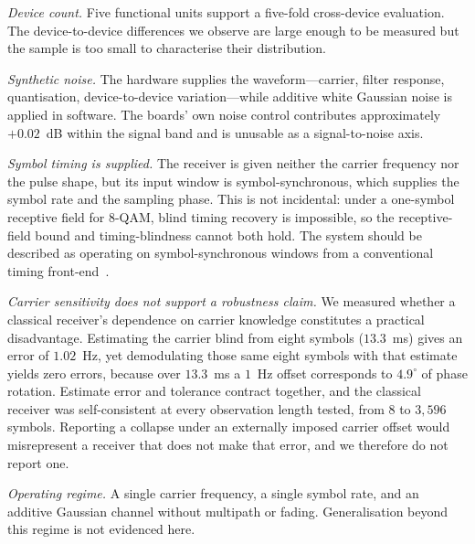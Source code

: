 \documentclass[journal]{IEEEtran}   %
\begin{document}
\emph{Device count.} Five functional units support a five-fold cross-device
evaluation. The device-to-device differences we observe are large enough to be
measured but the sample is too small to characterise their distribution.

\emph{Synthetic noise.} The hardware supplies the waveform---carrier, filter
response, quantisation, device-to-device variation---while additive white
Gaussian noise is applied in software. The boards' own noise control contributes
approximately $+0.02$~dB within the signal band and is unusable as a
signal-to-noise axis.

\emph{Symbol timing is supplied.} The receiver is given neither the carrier
frequency nor the pulse shape, but its input window is symbol-synchronous, which
supplies the symbol rate and the sampling phase. This is not incidental: under a
one-symbol receptive field for 8-QAM, blind timing recovery is impossible, so
the receptive-field bound and timing-blindness cannot both hold. The system
should be described as operating on symbol-synchronous windows from a
conventional timing front-end~\cite{gardner1986ted}.

\emph{Carrier sensitivity does not support a robustness claim.} We measured
whether a classical receiver's dependence on carrier knowledge constitutes a
practical disadvantage. Estimating the carrier blind from eight symbols
($13.3$~ms) gives an error of $1.02$~Hz, yet demodulating those same eight
symbols with that estimate yields zero errors, because over $13.3$~ms a $1$~Hz
offset corresponds to $4.9^{\circ}$ of phase rotation. Estimate error and
tolerance contract together, and the classical receiver was self-consistent at
every observation length tested, from 8 to $3{,}596$ symbols. Reporting a
collapse under an externally imposed carrier offset would misrepresent a
receiver that does not make that error, and we therefore do not report one.

\emph{Operating regime.} A single carrier frequency, a single symbol rate, and
an additive Gaussian channel without multipath or fading. Generalisation beyond
this regime is not evidenced here.

\end{document}
